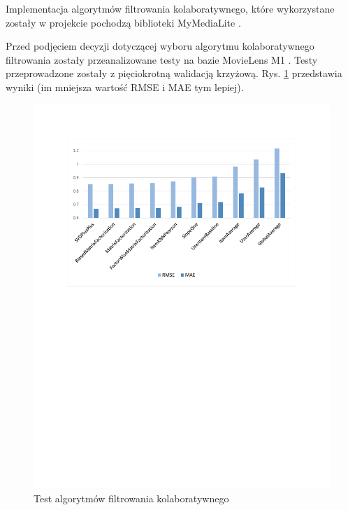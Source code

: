 \documentclass[twoside]{iisthesis}
\begin{document}
		 Implementacja algorytmów filtrowania kolaboratywnego, które wykorzystane zostały w projekcie pochodzą biblioteki MyMediaLite \cite{mymedialite,gantner2011mymedialite}. 
	 
		 Przed podjęciem decyzji dotyczącej wyboru algorytmu kolaboratywnego filtrowania zostały przeanalizowane testy na bazie MovieLens M1 \cite{harper2016movielens}. Testy przeprowadzone zostały z pięciokrotną walidacją krzyżową. Rys. \ref{fig:cfcomparision} przedstawia wyniki (im mniejsza wartość RMSE i MAE tym lepiej). 
	 
		 \begin{figure}[!ht] 
		 	\centering
		 	\includegraphics[width=1\textwidth]{cfcomparision}
		 	\caption{Test algorytmów filtrowania kolaboratywnego \protect\cite{mymedialitedatasets}}
		 	\label{fig:cfcomparision}
		 \end{figure}
	 
	 
\end{document}
